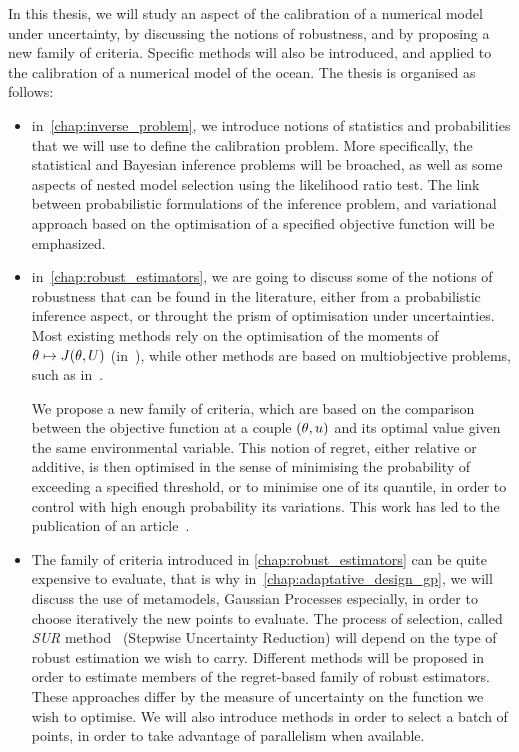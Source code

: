\documentclass[../../Main_ManuscritThese.tex]{subfiles}
\begin{document}
In this thesis, we will study an aspect of the calibration of a
numerical model under uncertainty, by discussing the notions of
robustness, and by proposing a new family of criteria.  Specific
methods will also be introduced, and applied to the calibration of a
numerical model of the ocean. The thesis is organised as follows:
\begin{itemize}
\item in~\cref{chap:inverse_problem}, we introduce notions of
  statistics and probabilities that we will use to define the
  calibration problem. More specifically, the statistical and Bayesian
  inference problems will be broached, as well as some aspects of
  nested model selection using the likelihood ratio test. The link
  between probabilistic formulations of the inference problem, and
  variational approach based on the optimisation of a specified
  objective function will be emphasized.
  
\item in~\cref{chap:robust_estimators}, we are going to discuss some
  of the notions of robustness that can be found in the literature,
  either from a probabilistic inference aspect, or throught the prism
  of optimisation under uncertainties. Most existing methods rely on
  the optimisation of the moments of $\theta\mapsto J(\theta,U)$
  (in~\cite{lehman_designing_2004,janusevskis_simultaneous_2010}),
  while other methods are based on multiobjective problems, such as
  in~\cite{baudoui_optimisation_2012,ribaud_krigeage_2018}.%

  We propose a new family of criteria, which are based on the
  comparison between the objective function at a couple $(\theta,u)$
  and its optimal value given the same environmental variable. This
  notion of regret, either relative or additive, is then optimised in
  the sense of minimising the probability of exceeding a specified
  threshold, or to minimise one of its quantile, in order to control
  with high enough probability its variations. This work has led to
  the publication of an article~\citep{trappler_robust_2020}.
  
\item The family of criteria introduced in
  \cref{chap:robust_estimators} can be quite expensive to evaluate,
  that is why in~\cref{chap:adaptative_design_gp}, we will discuss the
  use of metamodels, Gaussian Processes especially, in order to choose
  iteratively the new points to evaluate. The process of selection,
  called \emph{SUR} method~\citep{bect_sequential_2012} (Stepwise
  Uncertainty Reduction) will depend on the type of robust estimation
  we wish to carry. Different methods will be proposed in order to
  estimate members of the regret-based family of robust
  estimators. These approaches differ by the measure of uncertainty on
  the function we wish to optimise. We will also introduce methods in
  order to select a batch of points, in order to take advantage of
  parallelism when available.


\end{itemize}
\end{document}
